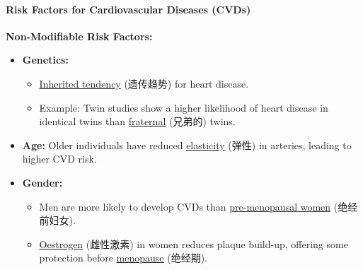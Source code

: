 \paragraph{Risk Factors for Cardiovascular Diseases (CVDs)}
\textbf{Non-Modifiable Risk Factors:}
\begin{itemize}
    \item \textbf{Genetics:}
    \begin{itemize}
        \item \underline{Inherited tendency} (遗传趋势) for heart disease.
        \item Example: Twin studies show a higher likelihood of heart disease in identical twins than \underline{fraternal}
        (兄弟的) twins.
    \end{itemize}
    \item \textbf{Age:} Older individuals have reduced \underline{elasticity} (弹性) in arteries, leading to higher CVD risk.
    \item \textbf{Gender:}
    \begin{itemize}
        \item Men are more likely to develop CVDs than \underline{pre-menopausal women} (绝经前妇女).
        \item \underline{Oestrogen} (雌性激素) in women reduces plaque build-up, offering some protection before
        \underline{menopause} (绝经期).
    \end{itemize}
\end{itemize}